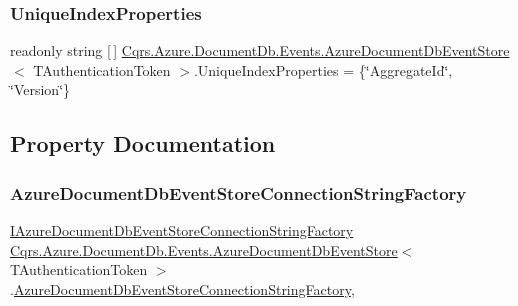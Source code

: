 \subsubsection{\texorpdfstring{Unique\+Index\+Properties}{UniqueIndexProperties}}
{\footnotesize\ttfamily readonly string \mbox{[}$\,$\mbox{]} \hyperlink{classCqrs_1_1Azure_1_1DocumentDb_1_1Events_1_1AzureDocumentDbEventStore}{Cqrs.\+Azure.\+Document\+Db.\+Events.\+Azure\+Document\+Db\+Event\+Store}$<$ T\+Authentication\+Token $>$.Unique\+Index\+Properties = \{\char`\"{}Aggregate\+Id\char`\"{}, \char`\"{}Version\char`\"{}\}\hspace{0.3cm}{\ttfamily [protected]}}



\subsection{Property Documentation}
\mbox{\label{classCqrs_1_1Azure_1_1DocumentDb_1_1Events_1_1AzureDocumentDbEventStore_a5a651f82c71bf8bd51114a3dc63a87a6}} 
\subsubsection{\texorpdfstring{Azure\+Document\+Db\+Event\+Store\+Connection\+String\+Factory}{AzureDocumentDbEventStoreConnectionStringFactory}}
{\footnotesize\ttfamily \hyperlink{interfaceCqrs_1_1Azure_1_1DocumentDb_1_1Events_1_1IAzureDocumentDbEventStoreConnectionStringFactory}{I\+Azure\+Document\+Db\+Event\+Store\+Connection\+String\+Factory} \hyperlink{classCqrs_1_1Azure_1_1DocumentDb_1_1Events_1_1AzureDocumentDbEventStore}{Cqrs.\+Azure.\+Document\+Db.\+Events.\+Azure\+Document\+Db\+Event\+Store}$<$ T\+Authentication\+Token $>$.\hyperlink{classCqrs_1_1Azure_1_1DocumentDb_1_1Events_1_1AzureDocumentDbEventStoreConnectionStringFactory}{Azure\+Document\+Db\+Event\+Store\+Connection\+String\+Factory}\hspace{0.3cm}{\ttfamily [get]}, {\ttfamily [protected]}}

